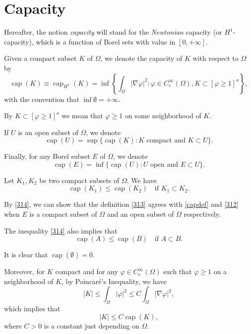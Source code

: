\documentclass[a4paper, 11pt]{report}
\theoremstyle{definition}\newtheorem*{rmk}{Remark}
\DeclareMathOperator{\capa}{cap}
\begin{document}
\section{Capacity}
\mbox{}

Hereafter, the notion \emph{capacity} will stand for the \emph{Newtonian} capacity (or $H^1$-capacity), which is a function of Borel sets with value in $[0,+\infty]$.

Given a compact subset $K$ of $\Omega$, we denote the capacity  of $K$ with respect to $\Omega$ by
\begin{equation}\label{capdef}
\capa(K) \equiv \capa_{H^1}(K) = \inf \left\{ \int_{\Omega} |\nabla \varphi |^2: \varphi\in C_c^{\infty}(\Omega), K \subset [\varphi\ge 1]^o \right\},
\end{equation}
with the convention that $\inf \emptyset = +\infty$.

By $K \subset [\varphi\ge 1]^o$ we mean that $\varphi \ge 1$ on some neighborhood of $K$.

If $U$ is an open subset of $\Omega$, we denote
\begin{equation}\label{312}
\capa(U) = \sup \{\capa(K): K\text{ compact and } K\subset U \}.
\end{equation}

Finally, for any Borel subset $E$ of $\Omega$, we denote
\begin{equation}\label{313}
\capa(E) = \inf \{\capa(U): U\text{ open and } E \subset U\}.
\end{equation}

Let $K_1, K_2$ be two compact subsets of $\Omega$. We have
\begin{equation}\label{314}
\capa(K_1) \le \capa(K_2) \quad\text{if }K_1\subset K_2.
\end{equation}

By \eqref{314}, we can show that the definition \eqref{313} agrees with \eqref{capdef} and \eqref{312} when $E$ is a compact subset of $\Omega$ and an open subset of $\Omega$ respectively.

The inequality \eqref{314} also implies that
\begin{equation}\label{cap1}
\capa(A) \le \capa(B) \quad \text{if }A\subset B.
\end{equation}

It is clear that $\capa (\emptyset) = 0$.

Moreover, for $K$ compact and for any $\varphi \in C_c^{\infty}(\Omega)$ such that $\varphi \ge 1$ on a neighborhood of $K$, by Poincar\'e's Inequality, we have 
\[
|K| \le \int_{\Omega}|\varphi|^2 \le C \int_{\Omega} |\nabla \varphi |^2,
\]
which implies that
\[
|K| \le C \capa(K),
\]
where $C > 0$ is a constant just depending on $\Omega$. 
\end{document}
